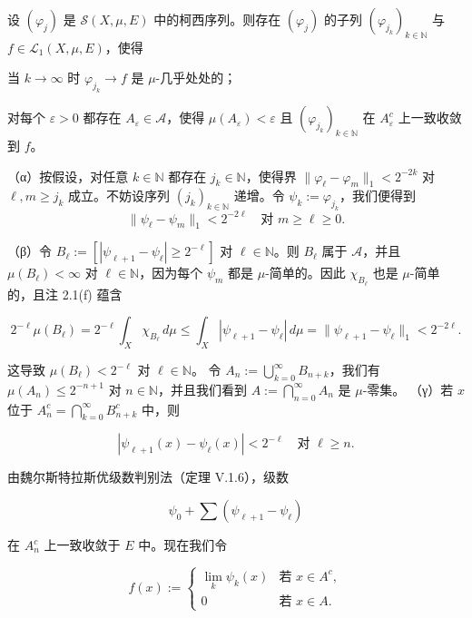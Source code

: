 \begin{lemma}

设 $ (\varphi_j) $ 是 $ \mathcal{S}(X,\mu,E) $ 中的柯西序列。则存在 $ (\varphi_j) $ 的子列 $ (\varphi_{j_k})_{k \in \mathbb{N}} $ 与 $ f \in \mathcal{L}_1(X,\mu,E) $，使得

\begin{subitems}
\item

当 $ k \to \infty $ 时 $ \varphi_{j_k} \to f $ 是 $ \mu $-几乎处处的；

\item

对每个 $ \varepsilon > 0 $ 都存在 $ A_\varepsilon \in \mathcal{A} $，使得 $ \mu(A_\varepsilon) < \varepsilon $ 且 $ (\varphi_{j_k})_{k \in \mathbb{N}} $ 在 $ A_\varepsilon^{c} $ 上一致收敛到 $ f $。

\proofhead
（α）按假设，对任意 $ k \in \mathbb{N} $ 都存在 $ j_k \in \mathbb{N} $，使得界 $ \|\varphi_\ell - \varphi_m\|_1 < 2^{-2k} $ 对 $ \ell, m \ge j_k $ 成立。不妨设序列 $ (j_k)_{k \in \mathbb{N}} $ 递增。令 $ \psi_k := \varphi_{j_k} $，我们便得到
\[
\|\psi_\ell - \psi_m\|_1 < 2^{-2\ell} \quad \text{对 } m \ge \ell \ge 0 .
\]

（β）令 $ B_\ell := \left[ |\psi_{\ell+1} - \psi_\ell| \ge 2^{-\ell} \right] $ 对 $ \ell \in \mathbb{N} $。则 $ B_\ell $ 属于 $ \mathcal{A} $，并且 $ \mu(B_\ell) < \infty $ 对 $ \ell \in \mathbb{N} $，因为每个 $ \psi_m $ 都是 $ \mu $-简单的。因此 $ \chi_{B_\ell} $ 也是 $ \mu $-简单的，且注 2.1(f) 蕴含

\[
2^{-\ell} \mu(B_\ell) = 2^{-\ell} \int_X \chi_{B_\ell} \, d\mu \le \int_X |\psi_{\ell+1} - \psi_\ell| \, d\mu = \|\psi_{\ell+1} - \psi_\ell\|_1 < 2^{-2\ell} .
\]

这导致 $ \mu(B_\ell) < 2^{-\ell} $ 对 $ \ell \in \mathbb{N} $。
令 $ A_n := \bigcup_{k=0}^{\infty} B_{n+k} $，我们有 $ \mu(A_n) \le 2^{-n+1} $ 对 $ n \in \mathbb{N} $，并且我们看到 $ A := \bigcap_{n=0}^{\infty} A_n $ 是 $ \mu $-零集。
（γ）若 $ x $ 位于 $ A_n^{c} = \bigcap_{k=0}^{\infty} B_{n+k}^{c} $ 中，则

\[
|\psi_{\ell+1}(x) - \psi_\ell(x)| < 2^{-\ell} \quad \text{对 } \ell \ge n .
\]

由魏尔斯特拉斯优级数判别法（定理 V.1.6），级数

\[
\psi_0 + \sum (\psi_{\ell+1} - \psi_\ell)
\]

在 $ A_n^{c} $ 上一致收敛于 $ E $ 中。现在我们令

\begin{equation*}
f(x) := \begin{cases} \lim_k \psi_k(x) & \text{若 } x \in A^{c} , \\ 0 & \text{若 } x \in A . \end{cases}
\end{equation*}


\end{subitems}
\end{lemma}
